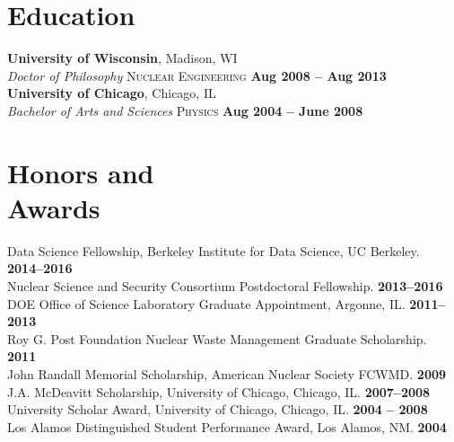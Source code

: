 \documentclass[margin,line]{resume}
\begin{document}
\begin{resume}
    \vspace{-3mm}
    \section{\mysidestyle Education}
    \textbf{University of Wisconsin}, Madison, WI \\%
        \textsl{Doctor of Philosophy} \textsc{Nuclear Engineering}\hfill \textbf{ Aug 2008 -- Aug 2013}\vspace{1mm}\\%
    \textbf{University of Chicago}, Chicago, IL \\%
	\textsl{Bachelor of Arts and Sciences}\textsc{ Physics} \hfill \textbf{Aug 2004 -- June 2008}%
    \vspace{-3mm}
    \section{\mysidestyle Honors and\\Awards} 
                Data Science Fellowship, Berkeley Institute for Data Science, UC Berkeley.    \hfill \textbf{2014--2016}\vspace{.5mm}\\%
                Nuclear Science and Security Consortium Postdoctoral Fellowship.   \hfill \textbf{2013--2016}\vspace{.5mm}\\%
		DOE Office of Science Laboratory Graduate Appointment, Argonne, IL.   \hfill \textbf{2011--2013}\vspace{.5mm}\\%
		Roy G. Post Foundation Nuclear Waste Management Graduate Scholarship.       \hfill \textbf{2011}\vspace{.5mm}\\%
		John Randall Memorial Scholarship, American Nuclear Society FCWMD.          \hfill \textbf{2009}\vspace{.5mm}\\%
		J.A. McDeavitt Scholarship, University of Chicago, Chicago, IL.        \hfill\textbf{2007--2008}\vspace{.5mm}\\%
		University Scholar Award, University of Chicago, Chicago, IL.        \hfill\textbf{2004 -- 2008}\vspace{.5mm}\\%
		Los Alamos Distinguished Student Performance Award, Los Alamos, NM.          \hfill\textbf{2004}%
    \vspace{-3mm}

\end{resume}
\end{document}
